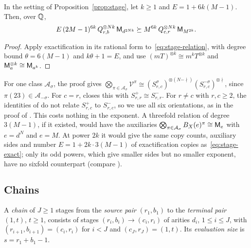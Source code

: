 \begin{corollary}\label{cor:exact-stage}
In the setting of Proposition~\ref{prop:stage}, let \(k\ge1\) and
\(E=1+6k(M-1)\). Then, over \(\mathbb Q\),
\begin{equation}\label{eq:stage-exact}
 E\,(2M-1)^{6k}\,Q_{r,b}^{\otimes Nk}\,\mathsf M_{d^{2Nk}}
 \succeq M^{6k}\,Q_{c,r}^{\otimes Nk}\,\mathsf M_{M^{2k}} .
\end{equation}
\end{corollary}

\begin{proof}
Apply exactification in its rational form \citep[Lemmas~2.2
and~9.1(c)]{FinCon26} to~\eqref{eq:stage-relation}, with degree bound
\(\theta=6(M-1)\) and \(k\theta+1=E\), and use \((mT)^{\otimes k}\cong m^kT^{\otimes k}\) and
\(\mathsf M_a^{\otimes k}\cong\mathsf M_{a^k}\).
\end{proof}

\begin{remark}\label{rem:both-signs}
For one class \(\mathcal A_\sigma\), the proof gives
\(\bigotimes_{\pi\in\mathcal A_\sigma}\mathcal V^\pi\cong
(S^\sigma_{r,c})^{\otimes(N-\nmid)}(S^{-\sigma}_{r,c})^{\otimes\nmid}\),
since \(\pi(23)\in\mathcal A_{-\sigma}\). For \(c=r\),
\citep[(4.6)]{FinCon26} closes this with \(S^+_{r,r}\cong S^-_{r,r}\). For
\(r\ne c\) with \(r,c\ge2\), the identities of \citep[(2.6)]{FinCon26} do
not relate \(S^+_{r,c}\) to \(S^-_{r,c}\), so we use all six
orientations, as in the proof of \citep[Lemma~4.2]{OAI26}. This costs
nothing in the exponent. A threefold relation of degree \(3(M-1)\), if it
existed, would have the auxiliaries
\(\bigotimes_{\pi\in\mathcal A_\sigma}B_X(e)^\pi\cong\mathsf M_e\)
\citep[(2.2)]{FinCon26} with \(e=d^N\) and \(e=M\). At power \(2k\) it
would give the same copy counts, auxiliary sides and number
\(E=1+2k\cdot3(M-1)\) of exactification copies
as~\eqref{eq:stage-exact}; only its odd powers, which give smaller sides
but no smaller exponent, have no sixfold counterpart (compare
\citep[Appendix~A.4]{FinCon26}).
\end{remark}

\subsection{Chains}
\label{subsec:chain-counts}

A \emph{chain} of \(J\ge1\) stages from the \emph{source pair}
\((r_1,b_1)\) to the \emph{terminal pair} \((1,t)\), \(t\ge1\), consists
of stages \((r_i,b_i)\to(c_i,r_i)\) of arities \(d_i\), \(1\le i\le J\),
with \((r_{i+1},b_{i+1})=(c_i,r_i)\) for \(i<J\) and \((c_J,r_J)=(1,t)\).
Its \emph{evaluation size} is \(s=r_1+b_1-1\).

